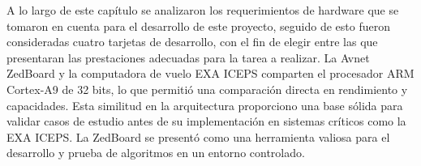 A lo largo de este capítulo se analizaron los requerimientos de hardware que se tomaron en cuenta para el desarrollo de este proyecto, seguido de esto fueron consideradas cuatro tarjetas de desarrollo, con el fin de elegir entre las que presentaran las prestaciones adecuadas para la tarea a realizar. La Avnet ZedBoard y la computadora de vuelo EXA ICEPS comparten el procesador ARM Cortex-A9 de 32 bits, lo que permitió una comparación directa en rendimiento y capacidades. Esta similitud en la arquitectura proporciono una base sólida para validar casos de estudio antes de su implementación en sistemas críticos como la EXA ICEPS. La ZedBoard se presentó como una herramienta valiosa para el desarrollo y prueba de algoritmos en un entorno controlado.